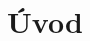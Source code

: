 \documentclass[]{tukediphc}
\begin{document}
\kpredhovoru

\thispagestyle{empty}
\tableofcontents
\newpage

\thispagestyle{empty}

{	\makeatletter
	\renewcommand{\l@figure}{\@dottedtocline{1}{1.5em}{3.5em}}
	\makeatother
	\listoffigures}



\newpage

\thispagestyle{empty}

\newpage

\thispagestyle{empty}

\newpage

\section{Úvod}
\end{document}

